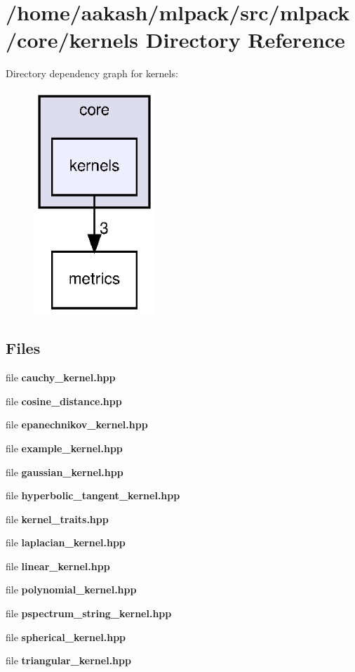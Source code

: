 \section{/home/aakash/mlpack/src/mlpack/core/kernels Directory Reference}
\label{dir_b554345f14f7af9192a000ede2774b80}
Directory dependency graph for kernels\+:
\nopagebreak
\begin{figure}[H]
\begin{center}
\leavevmode
\includegraphics[width=130pt]{dir_b554345f14f7af9192a000ede2774b80_dep}
\end{center}
\end{figure}
\subsection*{Files}
\begin{DoxyCompactItemize}
\item 
file \textbf{ cauchy\+\_\+kernel.\+hpp}
\item 
file \textbf{ cosine\+\_\+distance.\+hpp}
\item 
file \textbf{ epanechnikov\+\_\+kernel.\+hpp}
\item 
file \textbf{ example\+\_\+kernel.\+hpp}
\item 
file \textbf{ gaussian\+\_\+kernel.\+hpp}
\item 
file \textbf{ hyperbolic\+\_\+tangent\+\_\+kernel.\+hpp}
\item 
file \textbf{ kernel\+\_\+traits.\+hpp}
\item 
file \textbf{ laplacian\+\_\+kernel.\+hpp}
\item 
file \textbf{ linear\+\_\+kernel.\+hpp}
\item 
file \textbf{ polynomial\+\_\+kernel.\+hpp}
\item 
file \textbf{ pspectrum\+\_\+string\+\_\+kernel.\+hpp}
\item 
file \textbf{ spherical\+\_\+kernel.\+hpp}
\item 
file \textbf{ triangular\+\_\+kernel.\+hpp}
\end{DoxyCompactItemize}
